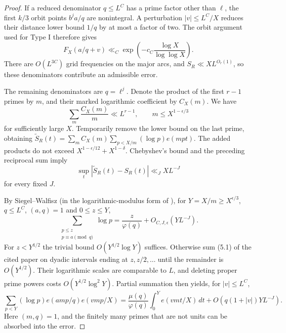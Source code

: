 \documentclass[11pt,a4paper]{article}
\theoremstyle{paperplain}
\numberwithin{equation}{section}
\begin{document}
\begin{proof}
If a reduced denominator $q\le L^C$ has a prime factor other than $\ell$,
the first $k/3$ orbit points $b^ja/q$ are nonintegral. A perturbation
$|v|\le L^C/X$ reduces their distance lower bound $1/q$ by at most
a factor of two. The orbit argument used for Type I therefore gives
\[
 F_X(a/q+v)\ll_C
       \exp\left(-c_C\frac{\log X}{\log\log X}\right).
\]
There are $O(L^{3C})$ grid frequencies on the major arcs, and
$S_R\ll X L^{O_r(1)}$, so these denominators contribute an admissible
error.

The remaining denominators are $q=\ell^j$. Denote the product of the
first $r-1$ primes by $m$, and their marked logarithmic coefficient
by $C_X(m)$. We have
\[
 \sum_m\frac{C_X(m)}m\ll L^{r-1},\qquad m\le X^{1-\epsilon/3}
\]
for sufficiently large $X$.
Temporarily remove the lower bound on the last prime, obtaining
$\widetilde S_R(t)=\sum_mC_X(m)\sum_{p<X/m}(\log p)e(mpt)$.
The added products do not exceed $X^{1-\epsilon/12}+X^{1-\delta}$.
Chebyshev's bound and the preceding reciprocal sum imply
\begin{equation}\label{arith:freeprime}
 \sup_t|\widetilde S_R(t)-S_R(t)|\ll_J XL^{-J}
\end{equation}
for every fixed $J$.

By Siegel--Walfisz (in the logarithmic-modulus form of
\cite[(5.1)]{Maynard2019}), for
$Y=X/m\ge X^{\epsilon/3}$,
$q\le L^C$, $(a,q)=1$ and $0\le z\le Y$,
\[
 \sum_{\substack{p\le z\\p\equiv a\pmod q}}\log p
       =\frac z{\varphi(q)}+O_{C,J,\epsilon}(YL^{-J}).
\]
For $z<Y^{1/2}$ the trivial bound $O(Y^{1/2}\log Y)$ suffices.
Otherwise sum (5.1) of the cited paper on dyadic intervals ending at
$z,z/2,\ldots$ until the remainder is $O(Y^{1/2})$. Their logarithmic
scales are comparable to $L$, and deleting proper prime powers costs
$O(Y^{1/2}\log^2 Y)$.
Partial summation then yields, for $|v|\le L^C$,
\begin{equation}\label{arith:APprime}
 \sum_{p<Y}(\log p)e(amp/q)e(vmp/X)
 =\frac{\mu(q)}{\varphi(q)}\int_0^Y e(vmt/X)\,dt
       +O(q(1+|v|)YL^{-J}).
\end{equation}
Here $(m,q)=1$, and the finitely many primes that are not units can be
absorbed into the error.


\end{proof}
\end{document}
